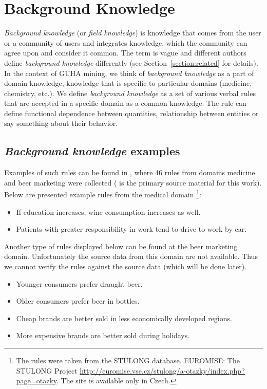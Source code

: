 \documentclass{llncs}
\begin{document}
\section{Background Knowledge}
\label{section:backgroundknowledge}

\emph{Background knowledge} (or \emph{field knowledge}) is knowledge that
comes from the user or a community of users and integrates knowledge, which
the community can agree upon and consider it common. The term is vague and
different authors define \emph{background knowledge} differently (see 
Section~\ref{section:related} for details). In the context of GUHA mining,
we think of \emph{background knowledge} as a part of domain knowledge,
knowledge that is specific to particular domains (medicine, chemistry, etc.).
We define \emph{background knowledge} as a set of various verbal rules that
are accepted in a specific domain as a common knowledge. The rule can
define functional dependence between quantities, relationship between entities
or say something about their behavior.

\subsection{\emph{Background knowledge} examples}
\label{section:bkexamples}
Examples of such rules can be found in \cite{Diplomka}, where 46 rules from 
domains medicine and beer marketing were collected (\cite{Diplomka} is the primary
source material for this work). Below are presented example rules from the medical domain
\footnote{The rules were taken from the STULONG database. EUROMISE: The STULONG Project
\url{http://euromise.vse.cz/stulong/a-otazky/index.php?page=otazky}. The site is
available only in Czech.}:

\begin{itemize}
\item If education increases, wine consumption increases as well.
\item Patients with greater responsibility in work tend to drive to work by car.
\end{itemize}

Another type of rules displayed below can be found at the beer marketing domain. 
Unfortunately the source data from this domain are not available. Thus we 
cannot verify the rules against the source data (which will be done later).

\begin{itemize}
\item Younger consumers prefer draught beer.
\item Older consumers prefer beer in bottles.
\item Cheap brands are better sold in less economically developed regions.
\item More expensive brands are better sold during holidays.
\end{itemize}
\end{document}
